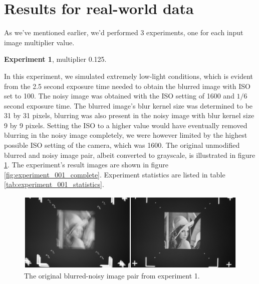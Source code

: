\documentclass[12pt,notitlepage]{report}
\begin{document}
\section{Results for real-world data}
\label{sec:real_world_data}

As we've mentioned earlier, we'd performed 3 experiments, one for each input image multiplier value.   

\noindent \textbf{Experiment 1}, multiplier 0.125.

In this experiment, we simulated extremely low-light conditions, which is evident from the 2.5 second exposure time needed to obtain the blurred image with ISO set to 100. The noisy image was obtained with the ISO setting of 1600 and $1/6$ second exposure time. The blurred image's blur kernel size was determined to be 31 by 31 pixels, blurring was also present in the noisy image with blur kernel size 9 by 9 pixels. Setting the ISO to a higher value would have eventually removed blurring in the noisy image completely, we were however limited by the highest possible ISO setting of the camera, which was 1600. The original unmodified blurred and noisy image pair, albeit converted to grayscale, is illustrated in figure \ref{fig:experiment_001_blurred_noisy}. The experiment's result images are shown in figure \ref{fig:experiment_001_complete}. Experiment statistics are listed in table \ref{tab:experiment_001_statistics}. 

\begin{figure}[htb]
 \begin{center}
  \includegraphics[width=12cm]{experiment_001_blurred_noisy.png}
 \end{center}
 \caption{The original blurred-noisy image pair from experiment 1.}
 \label{fig:experiment_001_blurred_noisy}
\end{figure}
\end{document}
